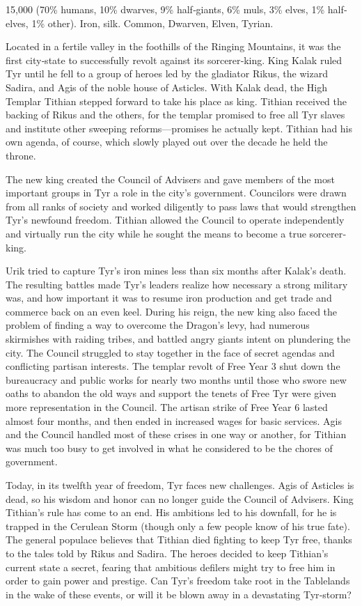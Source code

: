 {15,000 (70\% humans, 10\% dwarves, 9\% half‐giants, 6\% muls, 3\% elves, 1\% half‐elves, 1\% other).}
{Iron, silk.}
{Common, Dwarven, Elven, Tyrian.}
{
	Located in a fertile valley in the foothills of the Ringing Mountains, it was the first city‐state to successfully revolt against its sorcerer‐king. King Kalak ruled Tyr until he fell to a group of heroes led by the gladiator Rikus, the wizard Sadira, and Agis of the noble house of Asticles. With Kalak dead, the High Templar Tithian stepped forward to take his place as king. Tithian received the backing of Rikus and the others, for the templar promised to free all Tyr slaves and institute other sweeping reforms—promises he actually kept. Tithian had his own agenda, of course, which slowly played out over the decade he held the throne.

	The new king created the Council of Advisers and gave members of the most important groups in Tyr a role in the city's government. Councilors were drawn from all ranks of society and worked diligently to pass laws that would strengthen Tyr's newfound freedom. Tithian allowed the Council to operate independently and virtually run the city while he sought the means to become a true sorcerer‐king.

	Urik tried to capture Tyr's iron mines less than six months after Kalak's death. The resulting battles made Tyr's leaders realize how necessary a strong military was, and how important it was to resume iron production and get trade and commerce back on an even keel. During his reign, the new king also faced the problem of finding a way to overcome the Dragon's levy, had numerous skirmishes with raiding tribes, and battled angry giants intent on plundering the city. The Council struggled to stay together in the face of secret agendas and conflicting partisan interests. The templar revolt of Free Year 3 shut down the bureaucracy and public works for nearly two months until those who swore new oaths to abandon the old ways and support the tenets of Free Tyr were given more representation in the Council. The artisan strike of Free Year 6 lasted almost four months, and then ended in increased wages for basic services. Agis and the Council handled most of these crises in one way or another, for Tithian was much too busy to get involved in what he considered to be the chores of government.

	Today, in its twelfth year of freedom, Tyr faces new challenges. Agis of Asticles is dead, so his wisdom and honor can no longer guide the Council of Advisers. King Tithian's rule has come to an end. His ambitions led to his downfall, for he is trapped in the Cerulean Storm (though only a few people know of his true fate). The general populace believes that Tithian died fighting to keep Tyr free, thanks to the tales told by Rikus and Sadira. The heroes decided to keep Tithian's current state a secret, fearing that ambitious defilers might try to free him in order to gain power and prestige. Can Tyr's freedom take root in the Tablelands in the wake of these events, or will it be blown away in a devastating Tyr‐storm?

}
